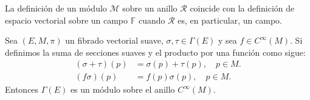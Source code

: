 La definición de un módulo $\mathcal{M}$ sobre un anillo $\mathcal{R}$ coincide con la definición de espacio vectorial sobre un campo $\mathbb{F}$ cuando $\mathcal{R}$ es, en particular, un campo.

\begin{theorem}\label{Teorema: Los Fibrados Vectoriales Son Modulos}
	Sea $(E,M, \pi)$ un fibrado vectorial suave, $\sigma, \tau \in \Gamma(E)$ y sea $f \in C^{\infty}(M)$. Si definimos la suma de secciones suaves y el producto por una función como sigue:
	\begin{align*}
		(\sigma + \tau)(p) & = \sigma(p) + \tau(p), \quad p \in M. \\
		(f\sigma)(p)       & = f(p)\sigma(p), \quad p \in M.
	\end{align*}
	Entonces $\Gamma(E)$ es un módulo sobre el anillo $C^{\infty}(M)$.
\end{theorem}

